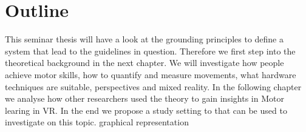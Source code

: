 \section{Outline}
This seminar thesis will have a look at the grounding principles to define a system that lead to the guidelines in question. Therefore we first step into the theoretical background in the next chapter. We will investigate how people achieve motor skills, how to quantify and measure movements, what hardware techniques are suitable, perspectives and mixed reality. In the following chapter we analyse how other researchers used the theory to gain insights in Motor learing in VR. In the end we propose a study setting to that can be used to investigate on this topic.
\todo graphical representation

